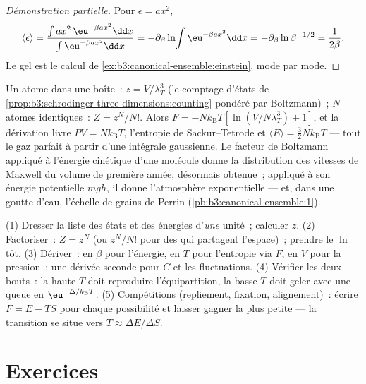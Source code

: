 \begin{proof}[Démonstration partielle]
Pour $\epsilon = ax^2$,
\[
\langle\epsilon\rangle
 = \frac{\int ax^2\,\eu^{-\beta ax^2}\dd x}
        {\int\eu^{-\beta ax^2}\dd x}
 = -\partial_\beta\ln\!\int\eu^{-\beta ax^2}\dd x
 = -\partial_\beta\ln\beta^{-1/2} = \frac{1}{2\beta} .
\] Le gel est le calcul de
\cref{ex:b3:canonical-ensemble:einstein}, mode par mode.
\end{proof}

\begin{example}\label{ex:b3:canonical-ensemble:gas}
Un atome dans une boîte~: $z = V/\lambda_T^3$ (le comptage d'états de
\cref{prop:b3:schrodinger-three-dimensions:counting} pondéré par
Boltzmann)~; $N$ atomes identiques~: $Z = z^N/N!$. Alors $F =
-Nk_{\text{B}}T[\ln(V/N\lambda_T^3) + 1]$, et la dérivation livre
$PV = Nk_{\text{B}}T$, l'entropie de Sackur--Tetrode et
$\langle E\rangle = \tfrac32 Nk_{\text{B}}T$ --- tout le gaz parfait
à partir d'une intégrale gaussienne. Le facteur de Boltzmann appliqué
à l'énergie cinétique d'une molécule donne la distribution des
vitesses de Maxwell du volume de première année, désormais obtenue~;
appliqué à son énergie potentielle $mgh$, il donne l'atmosphère
exponentielle --- et, dans une goutte d'eau, l'échelle de grains de
Perrin (\cref{pb:b3:canonical-ensemble:1}).
\end{example}

\begin{method}\label{met:b3:canonical-ensemble:method}
(1) Dresser la liste des états et des énergies d'\emph{une} unité~;
calculer $z$. (2) Factoriser~: $Z = z^N$ (ou $z^N/N!$ pour des
 qui partagent l'espace)~; prendre le $\ln$ tôt.
(3) Dériver~: en $\beta$ pour l'énergie, en $T$ pour l'entropie via
$F$, en $V$ pour la pression~; une dérivée seconde pour $C$ et les
fluctuations. (4) Vérifier les deux bouts~: la haute $T$ doit
reproduire l'équipartition, la basse $T$ doit geler avec une queue en
$\eu^{-\Delta/k_{\text{B}}T}$. (5) Compétitions (repliement, fixation,
alignement)~: écrire $F = E - TS$ pour chaque possibilité et laisser
gagner la plus petite --- la transition se situe vers $T \approx \Delta
E/\Delta S$.
\end{method}

\section{Exercices}

